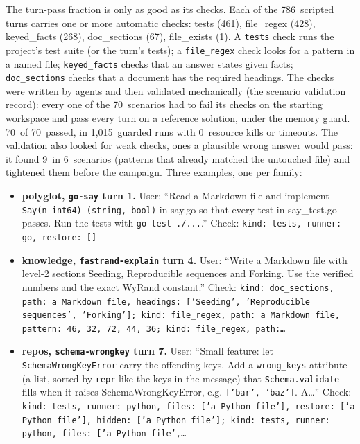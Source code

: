 \documentclass[11pt,letterpaper]{article}
\newcommand{\code}[1]{\texttt{#1}}
\newcommand{\RgCheckKinds}{tests (461), file\_regex (428), keyed\_facts (268), doc\_sections (67), file\_exists (1)}
\newcommand{\RgNTurnsScripted}{786}
\newcommand{\RgValKills}{0}
\newcommand{\RgValN}{70}
\newcommand{\RgValOK}{70}
\newcommand{\RgValRuns}{1{,}015}
\newcommand{\RgValWeak}{9}
\newcommand{\RgValWeakScen}{6}
\begin{document}
The turn-pass fraction is only as good as its checks. Each of the \RgNTurnsScripted\ scripted turns carries one or
more automatic checks: \RgCheckKinds. A \code{tests} check runs the project's test suite (or the turn's tests); a
\code{file\_regex} check looks for a pattern in a named file; \code{keyed\_facts} checks that an answer states given
facts; \code{doc\_sections} checks that a document has the required headings. The checks were written by agents
and then validated mechanically (the scenario validation record): every one of the
\RgValN\ scenarios had to fail its checks on the starting workspace and pass every turn on a reference solution,
under the memory guard. \RgValOK\ of \RgValN\ passed, in \RgValRuns\ guarded runs with \RgValKills\ resource kills
or timeouts. The validation also looked for weak checks, ones a plausible wrong answer would pass: it found
\RgValWeak\ in \RgValWeakScen\ scenarios (patterns that already matched the untouched file) and tightened them before
the campaign. Three examples, one per family:
{\raggedright
\begin{itemize}[leftmargin=1.2em]
\item \textbf{polyglot,\allowbreak{} \code{go-say} turn 1.} User: ``Read a Markdown file and implement \texttt{Say\allowbreak{}(n int64) \allowbreak{}(string,\allowbreak{} bool)} in say.go so that every test in say\_test.go passes. Run the tests with \texttt{go test ./\allowbreak{}...}.'' Check: \code{kind: tests,\allowbreak{} runner: go,\allowbreak{} restore: []}
\item \textbf{knowledge,\allowbreak{} \code{fastrand-explain} turn 4.} User: ``Write a Markdown file with level-2 sections Seeding,\allowbreak{} Reproducible sequences and Forking. Use the verified numbers and the exact WyRand constant.'' Check: \code{kind: doc\_sections,\allowbreak{} path: a Markdown file,\allowbreak{} headings: ['Seeding',\allowbreak{} 'Reproducible sequences',\allowbreak{} 'Forking']; kind: file\_regex,\allowbreak{} path: a Markdown file,\allowbreak{} pattern: 46,\allowbreak{} 32,\allowbreak{} 72,\allowbreak{} 44,\allowbreak{} 36; kind: file\_regex,\allowbreak{} path:\dots{}}
\item \textbf{repos,\allowbreak{} \code{schema-wrongkey} turn 7.} User: ``Small feature: let \texttt{SchemaWrongKeyError} carry the offending keys. Add a \texttt{wrong\_keys} attribute \allowbreak{}(a list,\allowbreak{} sorted by \texttt{repr} like the keys in the message) that \texttt{Schema.validate} fills when it raises SchemaWrongKeyError,\allowbreak{} e.g. \texttt{['bar',\allowbreak{} 'baz']}. A\dots{}'' Check: \code{kind: tests,\allowbreak{} runner: python,\allowbreak{} files: ['a Python file'],\allowbreak{} restore: ['a Python file'],\allowbreak{} hidden: ['a Python file']; kind: tests,\allowbreak{} runner: python,\allowbreak{} files: ['a Python file',\dots{}}
\end{itemize}
\par}
 
\end{document}
